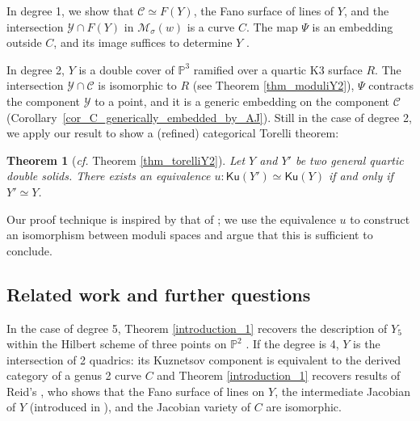 \documentclass[11pt]{amsart}
\newtheorem{thm}{Theorem}[section]
\theoremstyle{definition}
\newcommand{\pr}[1]{\mathbb P^{#1}}
\newcommand{\sY}{\mathcal{Y}}
\newcommand{\sM}{\mathcal{M}}
\newcommand{\sC}{\mathcal{C}}
\newcommand{\Ku}{\mathsf{Ku}}
\begin{document}
In degree 1, we show that $\sC\simeq F(Y)$, the Fano surface of lines of $Y$, and the intersection $\sY\cap F(Y)$ in $\sM_\sigma(w)$ is a curve $C$. The map $\Psi$ is an embedding outside $C$, and its image suffices to determine $Y$ \cite{Tih82}.

In degree 2, $Y$ is a double cover of $\pr 3$ ramified over a quartic K3 surface $R$. The intersection $\sY\cap \sC$ is isomorphic to $R$ (see Theorem \ref{thm_moduliY2}), $\Psi$ contracts the component $\sY$ to a point, and it is a generic embedding on the component $\sC$ (Corollary~\ref{cor_C_generically_embedded_by_AJ}).
Still in the case of degree 2, we apply our result to show a (refined) categorical Torelli theorem: 

\begin{thm}[\emph{cf.} Theorem \ref{thm_torelliY2}]\label{introduction_3}
Let $Y$ and $Y'$ be two general quartic double solids. There exists an equivalence $u \colon \Ku(Y') \simeq \Ku(Y)$ if and only if $Y'\simeq Y$.
 \end{thm}

Our proof technique is inspired by that of \cite{BMMS12}; we use the equivalence $u$ to construct an isomorphism between moduli spaces and argue that this is sufficient to conclude.

\subsection*{Related work and further questions}


In the case of degree 5, Theorem \ref{introduction_1} recovers the description of $Y_5$ within the Hilbert scheme of three points on $\pr 2$ \cite{Muk92}. If the degree is 4, $Y$ is the intersection of 2 quadrics: its Kuznetsov component is equivalent to the derived category of a genus 2 curve $C$ \cite{BO95} and Theorem \ref{introduction_1} recovers results of Reid's \cite{Rei72}, who shows that the Fano surface of lines on $Y$, the intermediate Jacobian of $Y$ (introduced in \cite{Clemens1972}), and the Jacobian variety of $C$ are isomorphic.
\end{document}
